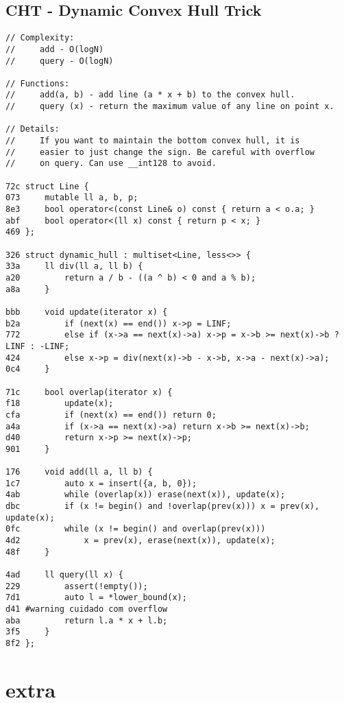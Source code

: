 \documentclass[11pt, a4paper, twoside]{article}
\begin{document}
\subsection{CHT - Dynamic Convex Hull Trick}
\begin{lstlisting}
// Complexity: 
//     add - O(logN)
//     query - O(logN)

// Functions:
//     add(a, b) - add line (a * x + b) to the convex hull.
//     query (x) - return the maximum value of any line on point x.

// Details:
//     If you want to maintain the bottom convex hull, it is
//     easier to just change the sign. Be careful with overflow
//     on query. Can use __int128 to avoid.

72c struct Line {
073     mutable ll a, b, p;
8e3     bool operator<(const Line& o) const { return a < o.a; }
abf     bool operator<(ll x) const { return p < x; }
469 };

326 struct dynamic_hull : multiset<Line, less<>> {
33a     ll div(ll a, ll b) { 
a20         return a / b - ((a ^ b) < 0 and a % b);
a8a     }
        
bbb     void update(iterator x) {
b2a         if (next(x) == end()) x->p = LINF;
772         else if (x->a == next(x)->a) x->p = x->b >= next(x)->b ? LINF : -LINF;
424         else x->p = div(next(x)->b - x->b, x->a - next(x)->a);
0c4     }
    
71c     bool overlap(iterator x) {
f18         update(x);
cfa         if (next(x) == end()) return 0;
a4a         if (x->a == next(x)->a) return x->b >= next(x)->b;
d40         return x->p >= next(x)->p;
901     }
            
176     void add(ll a, ll b) {
1c7         auto x = insert({a, b, 0});
4ab         while (overlap(x)) erase(next(x)), update(x);
dbc         if (x != begin() and !overlap(prev(x))) x = prev(x), update(x);
0fc         while (x != begin() and overlap(prev(x))) 
4d2             x = prev(x), erase(next(x)), update(x);
48f     }
        
4ad     ll query(ll x) {
229         assert(!empty());
7d1         auto l = *lower_bound(x);
d41 #warning cuidado com overflow
aba         return l.a * x + l.b;
3f5     }
8f2 };
\end{lstlisting}



%
%

\section{extra}
\end{document}
